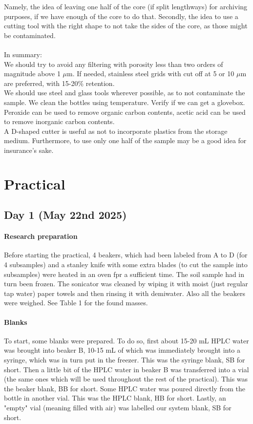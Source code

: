 \documentclass[twocolumn,a4paper,aps,amsmath,amssymb,floatfix,superscriptaddress]{revtex4-2}
\begin{document}
	Namely, the idea of leaving one half of the core (if split lengthways) for archiving purposes, if we have enough of the core to do that. Secondly, the idea to use a cutting tool with the right shape to not take the sides of the core, as those might be contaminated.\\
	\\
	In summary:\\
	We should try to avoid any filtering with porosity less than two orders of magnitude above 1 $\mu$m. If needed, stainless steel grids with cut off at 5 or 10 $\mu$m are preferred, with 15-20\% retention.\\
	We should use steel and glass tools wherever possible, as to not contaminate the sample.
	We clean the bottles using temperature. Verify if we can get a glovebox.\\
	Peroxide can be used to remove organic carbon contents, acetic acid can be used to remove inorganic carbon contents.\\
	A D-shaped cutter is useful as not to incorporate plastics from the storage medium. Furthermore, to use only one half of the sample may be a good idea for insurance's sake.
	
	\section{Practical}
	\subsection{Day 1 (May 22nd 2025)}
	\paragraph{Research preparation}
	Before starting the practical, 4 beakers, which had been labeled from A to D (for 4 subsamples) and a stanley knife with some extra blades (to cut the sample into subsamples) were heated in an oven fpr a sufficient time. The soil sample had in turn been frozen. The sonicator was cleaned by wiping it with moist (just regular tap water) paper towels and then rinsing it with demiwater. Also all the beakers were weighed. See Table 1 for the found masses.
	\paragraph{Blanks}
	To start, some blanks were prepared. To do so, first about 15-20 mL HPLC water was brought into beaker B, 10-15 mL of which was immediately brought into a syringe, which was in turn put in the freezer. This was the syringe blank, SB for short. Then a little bit of the HPLC water in beaker B was transferred into a vial (the same ones which will be used throughout the rest of the practical). This was the beaker blank, BB for short. Some HPLC water was poured directly from the bottle in another vial. This was the HPLC blank, HB for short. Lastly, an "empty" vial (meaning filled with air) was labelled our system blank, SB for short.
\end{document}
